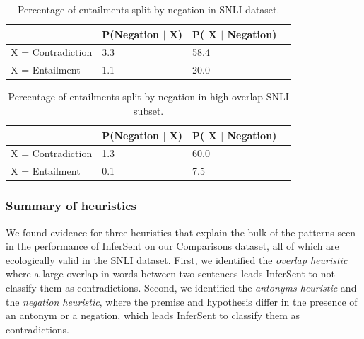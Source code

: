 \begin{table}[htb]
 \centering
  \begin{tabular}{llll}
  \toprule
    & P(Negation $|$ X) & P( X $|$ Negation) \\
    \midrule
    X = Contradiction & 3.3  & 58.4  \\
      X = Entailment &  1.1  &  20.0  \\
\bottomrule
  \end{tabular}
 \caption{Percentage of entailments split by negation in SNLI dataset.}
  \label{tab:negation}
\end{table}
%

\begin{table}[htb]
  \centering
  \begin{tabular}{llll}
  \toprule
    & P(Negation $|$ X) & P( X $|$ Negation) \\
    \midrule
    X = Contradiction & 1.3 & 60.0 \\
      X = Entailment &  0.1 &  7.5 \\
\bottomrule 
  \end{tabular}
 \caption{Percentage of entailments split by negation in high overlap SNLI subset.}
  \label{tab:negation-ho}
\end{table}


\subsubsection{Summary of heuristics}

We found evidence for three heuristics that explain the bulk of the patterns seen in the performance of InferSent on our Comparisons dataset, all of which are ecologically valid in the SNLI dataset. First, we identified the \textit{overlap heuristic} where a large overlap in words between two sentences leads InferSent to not classify them as contradictions. Second, we identified the \textit{antonyms heuristic} and the \textit{negation heuristic}, where the premise and hypothesis differ in the presence of an antonym or a negation, which leads InferSent to classify them as contradictions. 

